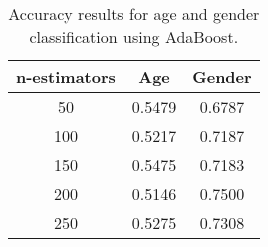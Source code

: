 \documentclass[a4paper]{llncs}
\begin{document}
\begin{table}[!htbp]
\centering
\begin{tabular}{|c|c|c|}
\hline
n-estimators & Age    & Gender \\ \hline
50           & 0.5479 & 0.6787 \\ \hline
100          & 0.5217 & 0.7187 \\ \hline
150          & 0.5475 & 0.7183 \\ \hline
200          & 0.5146 & 0.7500 \\ \hline
250          & 0.5275 & 0.7308 \\ \hline
\end{tabular}
\caption{Accuracy results for age and gender classification using AdaBoost.}
\label{table:AdaBoost}
\end{table}

%
\end{document}
